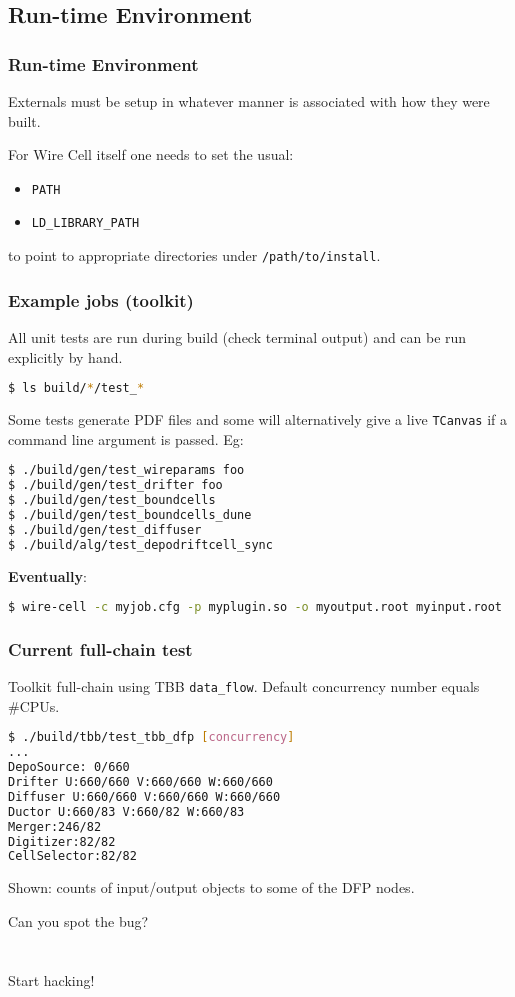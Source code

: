 \documentclass[xcolor=dvipsnames]{beamer}
\begin{document}
\subsection{Run-time Environment}

\begin{frame}[fragile]
  \frametitle{Run-time Environment}

  Externals must be setup in whatever manner is associated with how they were built.

  For Wire Cell itself one needs to set the usual:

  \begin{itemize}
  \item \verb|PATH|
  \item \verb|LD_LIBRARY_PATH|
  \end{itemize}

  to point to appropriate directories under \verb|/path/to/install|.

\end{frame}

\begin{frame}
  \frametitle{Example jobs (toolkit)}
  All unit tests are run during build (check terminal output) and can be run explicitly by hand.

\begin{lstlisting}[language=sh]
$ ls build/*/test_*
\end{lstlisting}

  Some tests generate PDF files and some will alternatively give a
  live \texttt{TCanvas} if a command line argument is passed.  Eg:

\begin{lstlisting}[language=sh]
$ ./build/gen/test_wireparams foo
$ ./build/gen/test_drifter foo
$ ./build/gen/test_boundcells
$ ./build/gen/test_boundcells_dune 
$ ./build/gen/test_diffuser
$ ./build/alg/test_depodriftcell_sync 
\end{lstlisting}

\textbf{Eventually}:
\begin{lstlisting}[language=sh]
$ wire-cell -c myjob.cfg -p myplugin.so -o myoutput.root myinput.root
\end{lstlisting}
\end{frame}

\begin{frame}[fragile]
  \frametitle{Current full-chain test}

  Toolkit full-chain using TBB \texttt{data\_flow}.  Default concurrency number equals \#CPUs.
\begin{lstlisting}[language=sh]
$ ./build/tbb/test_tbb_dfp [concurrency]
...
DepoSource: 0/660
Drifter U:660/660 V:660/660 W:660/660
Diffuser U:660/660 V:660/660 W:660/660
Ductor U:660/83 V:660/82 W:660/83
Merger:246/82
Digitizer:82/82
CellSelector:82/82
\end{lstlisting}

Shown: counts of input/output objects to some of the DFP nodes.

Can you spot the bug?
  
\end{frame}
\section{}

\begin{frame}
  \begin{center}
    Start hacking!
  \end{center}
\end{frame}
\end{document}
